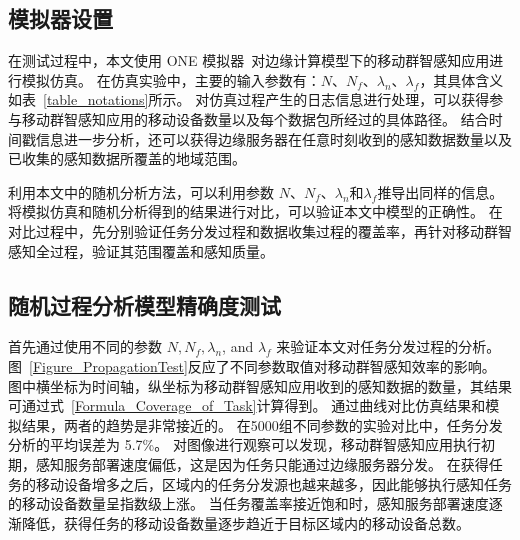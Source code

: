 \subsection{模拟器设置}
在测试过程中，本文使用 ONE 模拟器~\cite{DBLP:conf/simutools/OK09}对边缘计算模型下的移动群智感知应用进行模拟仿真。
在仿真实验中，主要的输入参数有：$N$、$N_f$、$\lambda_n$、$\lambda_f$，其具体含义如表~\ref{table_notations}所示。
对仿真过程产生的日志信息进行处理，可以获得参与移动群智感知应用的移动设备数量以及每个数据包所经过的具体路径。
结合时间戳信息进一步分析，还可以获得边缘服务器在任意时刻收到的感知数据数量以及已收集的感知数据所覆盖的地域范围。

利用本文中的随机分析方法，可以利用参数 $N$、$N_f$、$\lambda_n$和$\lambda_f$推导出同样的信息。
将模拟仿真和随机分析得到的结果进行对比，可以验证本文中模型的正确性。
在对比过程中，先分别验证任务分发过程和数据收集过程的覆盖率，再针对移动群智感知全过程，验证其范围覆盖和感知质量。


\subsection{随机过程分析模型精确度测试}

首先通过使用不同的参数 $N, N_f, \lambda_n$, and $\lambda_f$ 来验证本文对任务分发过程的分析。
图~\ref{Figure_PropagationTest}反应了不同参数取值对移动群智感知效率的影响。
图中横坐标为时间轴，纵坐标为移动群智感知应用收到的感知数据的数量，其结果可通过式~\eqref{Formula_Coverage_of_Task}计算得到。
通过曲线对比仿真结果和模拟结果，两者的趋势是非常接近的。
在5000组不同参数的实验对比中，任务分发分析的平均误差为 5.7\%。
对图像进行观察可以发现，移动群智感知应用执行初期，感知服务部署速度偏低，这是因为任务只能通过边缘服务器分发。
在获得任务的移动设备增多之后，区域内的任务分发源也越来越多，因此能够执行感知任务的移动设备数量呈指数级上涨。
当任务覆盖率接近饱和时，感知服务部署速度逐渐降低，获得任务的移动设备数量逐步趋近于目标区域内的移动设备总数。

